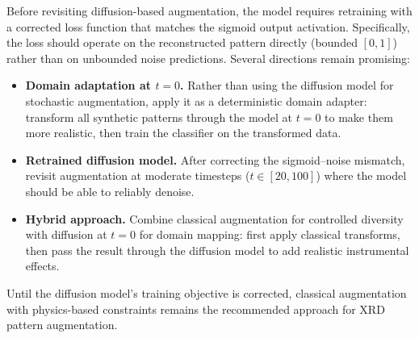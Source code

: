 Before revisiting diffusion-based augmentation, the model requires retraining with a corrected loss function that matches the sigmoid output activation. Specifically, the loss should operate on the reconstructed pattern directly (bounded $[0, 1]$) rather than on unbounded noise predictions. Several directions remain promising:

\begin{itemize}
    \item \textbf{Domain adaptation at $t{=}0$.} Rather than using the diffusion model for stochastic augmentation, apply it as a deterministic domain adapter: transform all synthetic patterns through the model at $t{=}0$ to make them more realistic, then train the classifier on the transformed data.
    \item \textbf{Retrained diffusion model.} After correcting the sigmoid--noise mismatch, revisit augmentation at moderate timesteps ($t \in [20, 100]$) where the model should be able to reliably denoise.
    \item \textbf{Hybrid approach.} Combine classical augmentation for controlled diversity with diffusion at $t{=}0$ for domain mapping: first apply classical transforms, then pass the result through the diffusion model to add realistic instrumental effects.
\end{itemize}

Until the diffusion model's training objective is corrected, classical augmentation with physics-based constraints remains the recommended approach for XRD pattern augmentation.
